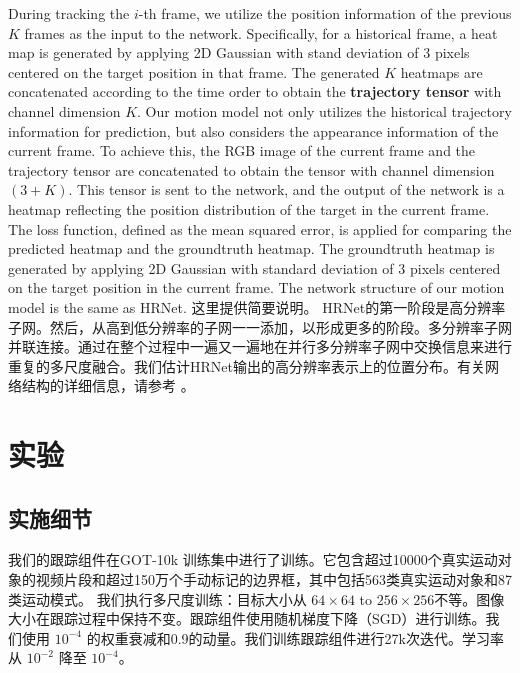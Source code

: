 During tracking the $i$-th frame, we utilize the position information of the previous $K$ frames as the input to the network.
Specifically, for a historical frame, a heat map is generated by applying 2D Gaussian with stand deviation of 3 pixels centered on the target position in that frame.
The generated $K$ heatmaps are concatenated according to the time order to obtain the \textbf{trajectory tensor} with channel dimension $K$.
Our motion model not only utilizes the historical trajectory information for prediction, but also considers the appearance information of the current frame.
To achieve this, the RGB image of the current frame and the trajectory tensor are concatenated to obtain the tensor with channel dimension $(3+K)$. This tensor is sent to the network, and the output of the network is a heatmap reflecting the position distribution of the target in the current frame. The loss function, defined as the mean squared error, is applied for comparing the predicted heatmap and the groundtruth heatmap. The groundtruth heatmap is generated by applying 2D Gaussian with standard deviation of 3 pixels centered on the target position in the current frame. The network structure of our motion model is the same as HRNet. 
\fi
这里提供简要说明。 HRNet的第一阶段是高分辨率子网。然后，从高到低分辨率的子网一一添加，以形成更多的阶段。多分辨率子网并联连接。通过在整个过程中一遍又一遍地在并行多分辨率子网中交换信息来进行重复的多尺度融合。我们估计HRNet输出的高分辨率表示上的位置分布。有关网络结构的详细信息，请参考 \cite{sun2019deep}。

\section{实验}
\label{sec:experiments}

\subsection{实施细节}
我们的跟踪组件在GOT-10k \cite{GOT-10k} 训练集中进行了训练。它包含超过10000个真实运动对象的视频片段和超过150万个手动标记的边界框，其中包括563类真实运动对象和87类运动模式。
我们执行多尺度训练：目标大小从 $64 \times 64$ to $256 \times 256$不等。图像大小在跟踪过程中保持不变。跟踪组件使用随机梯度下降（SGD）进行训练。我们使用 $10^{-4}$ 的权重衰减和0.9的动量。我们训练跟踪组件进行27k次迭代。学习率从 $10^{-2}$ 降至 $10^{-4}$。

